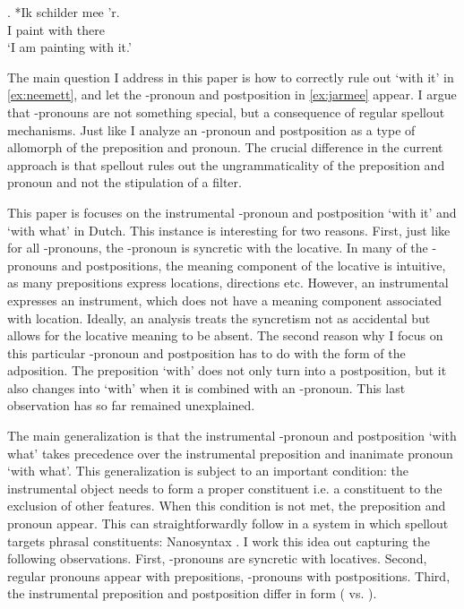 \documentclass[12pt]{article}
\begin{document}
\exg. *Ik schilder mee 'r.\\
 I paint with there\\
 `I am painting with it.'\label{ex:neemeer}

The main question I address in this paper is how to correctly rule out  `with it' in \ref{ex:neemett}, and let the -pronoun and postposition in \ref{ex:jarmee} appear. I argue that -pronouns are not something special, but a consequence of regular spellout mechanisms. Just like \citet{riemsdijk1978} I analyze an -pronoun and postposition as a type of allomorph of the preposition and pronoun. The crucial difference in the current approach is that spellout rules out the ungrammaticality of the preposition and pronoun and not the stipulation of a filter.

This paper is focuses on the instrumental -pronoun and postposition  `with it' and  `with what' in Dutch. This instance is interesting for two reasons. First, just like for all -pronouns, the -pronoun is syncretic with the locative. In many of the -pronouns and postpositions, the meaning component of the locative is intuitive, as many prepositions express locations, directions etc. However, an instrumental expresses an instrument, which does not have a meaning component associated with location. Ideally, an analysis treats the syncretism not as accidental but allows for the locative meaning to be absent.
The second reason why I focus on this particular -pronoun and postposition has to do with the form of the adposition. The preposition  `with' does not only turn into a postposition, but it also changes into  `with' when it is combined with an -pronoun. This last observation has so far remained unexplained.

The main generalization is that the instrumental -pronoun and postposition  `with what' takes precedence over the instrumental preposition and inanimate pronoun  `with what'. This generalization is subject to an important condition: the instrumental object needs to form a proper constituent i.e. a constituent to the exclusion of other features. When this condition is not met, the preposition and pronoun appear. This can straightforwardly follow in a system in which spellout targets phrasal constituents: Nanosyntax \citep{starke2009}. I work this idea out capturing the following observations. First, -pronouns are syncretic with locatives. Second, regular pronouns appear with prepositions, -pronouns with postpositions. Third, the instrumental preposition and postposition differ in form ( vs. ).
\end{document}
